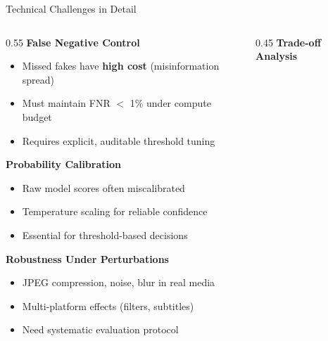 \documentclass[aspectratio=169,12pt]{beamer}
\newcommand{\alerttext}[1]{\textcolor{alertred}{\textbf{#1}}}
\begin{document}
\begin{frame}{Technical Challenges in Detail}
\begin{columns}[T]
\begin{column}{0.55\textwidth}
\footnotesize
\textbf{False Negative Control}
\begin{itemize}
\setlength\itemsep{0.02em}
    \item Missed fakes have \alerttext{high cost} (misinformation spread)
    \item Must maintain FNR $<$ 1\% under compute budget
    \item Requires explicit, auditable threshold tuning
\end{itemize}

\vspace{0.08em}
\textbf{Probability Calibration}
\begin{itemize}
\setlength\itemsep{0.02em}
    \item Raw model scores often miscalibrated
    \item Temperature scaling for reliable confidence
    \item Essential for threshold-based decisions
\end{itemize}

\vspace{0.08em}
\textbf{Robustness Under Perturbations}
\begin{itemize}
\setlength\itemsep{0.02em}
    \item JPEG compression, noise, blur in real media
    \item Multi-platform effects (filters, subtitles)
    \item Need systematic evaluation protocol
\end{itemize}
\end{column}

\begin{column}{0.45\textwidth}
\textbf{Trade-off Analysis}
\begin{center}
\end{center}
\end{column}
\end{columns}
\end{frame}
\end{document}
